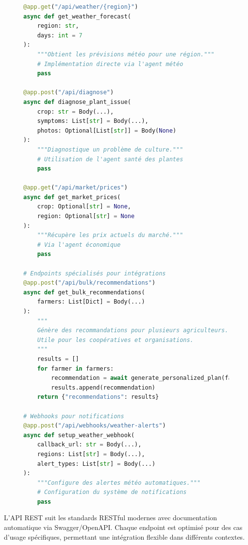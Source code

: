\begin{figure}[H]
\begin{lstlisting}[language=Python, caption=Points d'entrée de l'API REST]
@app.get("/api/weather/{region}")
async def get_weather_forecast(
    region: str,
    days: int = 7
):
    """Obtient les prévisions météo pour une région."""
    # Implémentation directe via l'agent météo
    pass

@app.post("/api/diagnose")
async def diagnose_plant_issue(
    crop: str = Body(...),
    symptoms: List[str] = Body(...),
    photos: Optional[List[str]] = Body(None)
):
    """Diagnostique un problème de culture."""
    # Utilisation de l'agent santé des plantes
    pass

@app.get("/api/market/prices")
async def get_market_prices(
    crop: Optional[str] = None,
    region: Optional[str] = None
):
    """Récupère les prix actuels du marché."""
    # Via l'agent économique
    pass

# Endpoints spécialisés pour intégrations
@app.post("/api/bulk/recommendations")
async def get_bulk_recommendations(
    farmers: List[Dict] = Body(...)
):
    """
    Génère des recommandations pour plusieurs agriculteurs.
    Utile pour les coopératives et organisations.
    """
    results = []
    for farmer in farmers:
        recommendation = await generate_personalized_plan(farmer)
        results.append(recommendation)
    return {"recommendations": results}

# Webhooks pour notifications
@app.post("/api/webhooks/weather-alerts")
async def setup_weather_webhook(
    callback_url: str = Body(...),
    regions: List[str] = Body(...),
    alert_types: List[str] = Body(...)
):
    """Configure des alertes météo automatiques."""
    # Configuration du système de notifications
    pass
\end{lstlisting}
\end{figure}

L'API REST suit les standards RESTful modernes avec documentation automatique via Swagger/OpenAPI. Chaque endpoint est optimisé pour des cas d'usage spécifiques, permettant une intégration flexible dans différents contextes.

